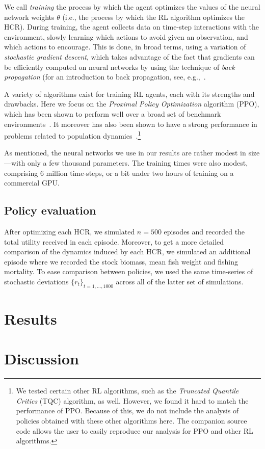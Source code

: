 \documentclass[floatfix,nofootinbib,longbibliography,notitlepage]{revtex4-1}
\begin{document}
We call \emph{training} the process by which the agent optimizes the values of the neural network weights $\theta$ (i.e., the process by which the RL algorithm optimizes the HCR). 
During training, the agent collects data on time-step interactions with the environment, slowly learning which actions to avoid given an observation, and which actions to encourage. 
This is done, in broad terms, using a variation of \emph{stochastic gradient descent}, which takes advantage of the fact that gradients can be efficiently computed on neural networks by using the technique of \emph{back propagation} (for an introduction to back propagation, see, e.g.,~\cite[Chapter~7]{rojas1996}.

A variety of algorithms exist for training RL agents, each with its strengths and drawbacks.
 Here we focus on the \emph{Proximal Policy Optimization} algorithm (PPO), which has been shown to perform well over a broad set of benchmark environments~\cite{schulman-ppo}. 
 It moreover has also been shown to have a strong performance in problems related to population dynamics~\cite{lapeyrolerie-rl,prettydarngood}.\footnote{
 We tested certain other RL algorithms, such as the \emph{Truncated Quantile Critics} (TQC) algorithm, as well. 
 However, we found it hard to match the performance of PPO. 
 Because of this, we do not include the analysis of policies obtained with these other algorithms here. 
 The companion source code allows the user to easily reproduce our analysis for PPO and other RL algorithms.
 }

 As mentioned, the neural networks we use in our results are rather modest in size—with only a few thousand parameters. 
 The training times were also modest, comprising 6 million time-steps, or a bit under two hours of training on a commercial GPU.


\subsection{Policy evaluation}

After optimizing each HCR, we simulated $n=500$ episodes and recorded the total utility received in each episode. 
Moreover, to get a more detailed comparison of the dynamics induced by each HCR, we simulated an additional episode where we recorded the stock biomass, mean fish weight and fishing mortality. 
To ease comparison between policies, we used the same time-series of stochastic deviations $\{r_t\}_{t=1,\dots,1000}$ across all of the latter set of simulations.

%
%
%
\section{Results}


%
%
%
\section{Discussion}




 

\end{document}
